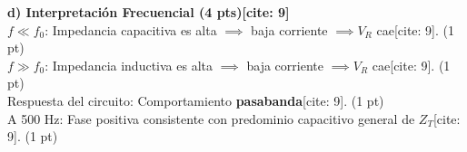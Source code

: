 \documentclass[11pt, a4paper]{article}
\begin{document}
\textbf{d) Interpretación Frecuencial (4 pts)[cite: 9]} \\
$f \ll f_0$: Impedancia capacitiva es alta $\implies$ baja corriente $\implies V_R$ cae[cite: 9]. (1 pt) \\
$f \gg f_0$: Impedancia inductiva es alta $\implies$ baja corriente $\implies V_R$ cae[cite: 9]. (1 pt) \\
Respuesta del circuito: Comportamiento \textbf{pasabanda}[cite: 9]. (1 pt) \\
A 500 Hz: Fase positiva consistente con predominio capacitivo general de $Z_T$[cite: 9]. (1 pt)
\end{document}
